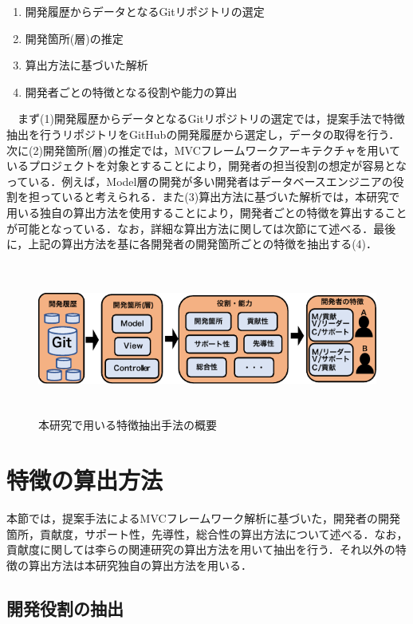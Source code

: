 \documentclass{funthesis}
\begin{document}
\begin{enumerate}
\renewcommand{\labelenumi}{(\arabic{enumi})}
 \item 開発履歴からデータとなるGitリポジトリの選定
 \item 開発箇所(層)の推定
 \item 算出方法に基づいた解析
 \item 開発者ごとの特徴となる役割や能力の算出
\end{enumerate}
　まず(1)開発履歴からデータとなるGitリポジトリの選定では，提案手法で特徴抽出を行うリポジトリをGitHubの開発履歴から選定し，データの取得を行う．次に(2)開発箇所(層)の推定では，MVCフレームワークアーキテクチャを用いているプロジェクトを対象とすることにより，開発者の担当役割の想定が容易となっている．例えば，Model層の開発が多い開発者はデータベースエンジニアの役割を担っていると考えられる．また(3)算出方法に基づいた解析では，本研究で用いる独自の算出方法を使用することにより，開発者ごとの特徴を算出することが可能となっている．なお，詳細な算出方法に関しては次節にて述べる．最後に，上記の算出方法を基に各開発者の開発箇所ごとの特徴を抽出する(4)．
\begin{figure}[H]
\centering  %
\includegraphics[clip,width=16cm,height=5cm]{figures/overview.pdf}
  \caption{本研究で用いる特徴抽出手法の概要}    \label{sample}
\end{figure}

\section{特徴の算出方法}
本節では，提案手法によるMVCフレームワーク解析に基づいた，開発者の開発箇所，貢献度，サポート性，先導性，総合性の算出方法について述べる．なお，貢献度に関しては李ら\cite{risyo}の関連研究の算出方法を用いて抽出を行う．それ以外の特徴の算出方法は本研究独自の算出方法を用いる．

\subsection{開発役割の抽出}
\end{document}
